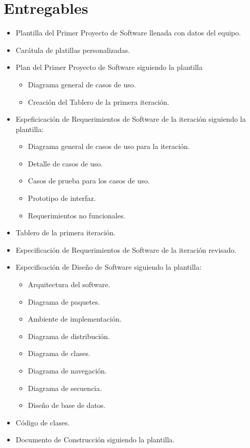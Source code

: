 \documentclass{article}
\begin{document}
\section{Entregables}
\begin{itemize}
\item Plantilla del Primer Proyecto de Software llenada con datos del equipo.
\item Carátula de platillas personalizadas.
\item Plan del Primer Proyecto de Software siguiendo la plantilla
  \begin{itemize}
  \item Diagrama general de casos de uso.
  \item Creación del Tablero de la primera iteración.
  \end{itemize}
\item Espeficicación de Requerimientos de Software de la iteración siguiendo la
  plantilla:
  \begin{itemize}
  \item Diagrama general de casos de uso para la iteración.
  \item Detalle de casos de uso.
  \item Casos de prueba para los casos de uso.
  \item Prototipo de interfaz.
  \item Requerimientos no funcionales.
  \end{itemize}
\item Tablero de la primera iteración.
\item Especificación de Requerimientos de Software de la iteración revisado.
\item Especificación de Diseño de Software siguiendo la plantilla:
  \begin{itemize}
  \item Arquitectura del software.
  \item Diagrama de paquetes.
  \item Ambiente de implementación.
  \item Diagrama de distribución.
  \item Diagrama de clases.
  \item Diagrama de navegación.
  \item Diagrama de secuencia.
  \item Diseño de base de datos.
  \end{itemize}
\item Código de clases.
\item Documento de Construcción siguiendo la plantilla.

\end{itemize}
\end{document}
